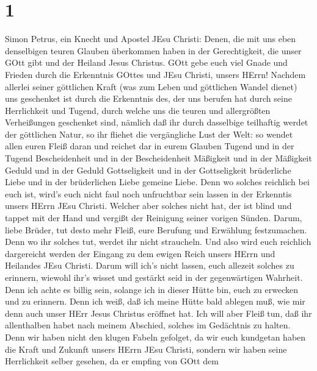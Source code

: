 \hypertarget{section}{%
\section{1}\label{section}}

 Simon Petrus, ein Knecht und Apostel JEsu Christi: Denen,
die mit uns eben denselbigen teuren Glauben überkommen haben in der
Gerechtigkeit, die unser GOtt gibt und der Heiland Jesus Christus.
 GOtt gebe euch viel Gnade und Frieden durch die Erkenntnis
GOttes und JEsu Christi, unsers HErrn!  Nachdem allerlei
seiner göttlichen Kraft (was zum Leben und göttlichen Wandel dienet) uns
geschenket ist durch die Erkenntnis des, der uns berufen hat durch seine
Herrlichkeit und Tugend,  durch welche uns die teuren und
allergrößten Verheißungen geschenket sind, nämlich daß ihr durch
dasselbige teilhaftig werdet der göttlichen Natur, so ihr fliehet die
vergängliche Lust der Welt:  so wendet allen euren Fleiß
daran und reichet dar in eurem Glauben Tugend und in der Tugend
Bescheidenheit  und in der Bescheidenheit Mäßigkeit und in
der Mäßigkeit Geduld und in der Geduld Gottseligkeit  und in
der Gottseligkeit brüderliche Liebe und in der brüderlichen Liebe
gemeine Liebe.  Denn wo solches reichlich bei euch ist,
wird's euch nicht faul noch unfruchtbar sein lassen in der Erkenntis
unsers HErrn JEsu Christi.  Welcher aber solches nicht hat,
der ist blind und tappet mit der Hand und vergißt der Reinigung seiner
vorigen Sünden.  Darum, liebe Brüder, tut desto mehr Fleiß,
eure Berufung und Erwählung festzumachen. Denn wo ihr solches tut,
werdet ihr nicht straucheln.  Und also wird euch reichlich
dargereicht werden der Eingang zu dem ewigen Reich unsers HErrn und
Heilandes JEsu Christi.  Darum will ich's nicht lassen,
euch allezeit solches zu erinnern, wiewohl ihr's wisset und gestärkt
seid in der gegenwärtigen Wahrheit.  Denn ich achte es
billig sein, solange ich in dieser Hütte bin, euch zu erwecken und zu
erinnern.  Denn ich weiß, daß ich meine Hütte bald ablegen
muß, wie mir denn auch unser HErr Jesus Christus eröffnet hat.
 Ich will aber Fleiß tun, daß ihr allenthalben habet nach
meinem Abschied, solches im Gedächtnis zu halten.  Denn wir
haben nicht den klugen Fabeln gefolget, da wir euch kundgetan haben die
Kraft und Zukunft unsers HErrn JEsu Christi, sondern wir haben seine
Herrlichkeit selber gesehen,  da er empfing von GOtt dem

